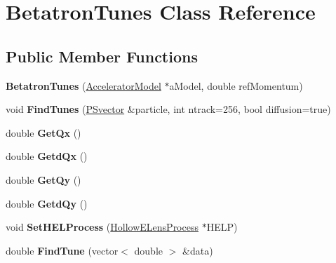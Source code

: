 \hypertarget{classBetatronTunes}{}\section{Betatron\+Tunes Class Reference}
\label{classBetatronTunes}
\subsection*{Public Member Functions}
\begin{DoxyCompactItemize}
\item 
\mbox{\label{classBetatronTunes_a267df4288b59cea8533f3b5301732481}} 
{\bfseries Betatron\+Tunes} (\hyperlink{classAcceleratorModel}{Accelerator\+Model} $\ast$a\+Model, double ref\+Momentum)
\item 
\mbox{\label{classBetatronTunes_a009b05c790ce6ad20ce6c36f8676ba7a}} 
void {\bfseries Find\+Tunes} (\hyperlink{classPSvector}{P\+Svector} \&particle, int ntrack=256, bool diffusion=true)
\item 
\mbox{\label{classBetatronTunes_a894d740f154eac6a0b522e7dda36520f}} 
double {\bfseries Get\+Qx} ()
\item 
\mbox{\label{classBetatronTunes_a280d562fb454aabcbf5d197b1d80f398}} 
double {\bfseries Getd\+Qx} ()
\item 
\mbox{\label{classBetatronTunes_a6f98a529a8b65d279c30c58b0f6e553d}} 
double {\bfseries Get\+Qy} ()
\item 
\mbox{\label{classBetatronTunes_aa9123db26a63dbc26f5ff6ac911abedb}} 
double {\bfseries Getd\+Qy} ()
\item 
\mbox{\label{classBetatronTunes_adba5af4b8588ada6f3d481d8ad9688fc}} 
void {\bfseries Set\+H\+E\+L\+Process} (\hyperlink{classParticleTracking_1_1HollowELensProcess}{Hollow\+E\+Lens\+Process} $\ast$H\+E\+LP)
\item 
\mbox{\label{classBetatronTunes_a2d9b4d26c4a86e3b0057cdbcd4e25a10}} 
double {\bfseries Find\+Tune} (vector$<$ double $>$ \&data)
\end{DoxyCompactItemize}
